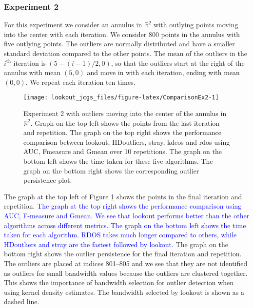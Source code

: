 \documentclass[12pt]{article}
\theoremstyle{definition}
\theoremstyle{definition}
\theoremstyle{definition}
\theoremstyle{definition}
\theoremstyle{remark}
\begin{document}
\hypertarget{experiment-2}{%
\subsubsection*{Experiment 2}\label{experiment-2}}

For this experiment we consider an annulus in \(\mathbb{R}^2\) with outlying points moving into the center with each iteration. We consider 800 points in the annulus with five outlying points. The outliers are normally distributed and have a smaller standard deviation compared to the other points. The mean of the outliers in the \(i^{\text{th}}\) iteration is \(\left(5 - (i-1) /2, 0 \right)\), so that the outliers start at the right of the annulus with mean \((5,0)\) and move in with each iteration, ending with mean \((0,0)\). We repeat each iteration ten times.

\begin{figure}
\texttt{[image: lookout\_jcgs\_files/figure-latex/ComparisonEx2-1]} \caption{Experiment 2 with outliers moving into the center of the annulus in $\mathbb{R}^2$. Graph on the top left shows the points from the last iteration and repetition. The graph on the top right shows the performance comparison between lookout, HDoutliers, stray, kdeos and rdos using AUC, Fmeasure and Gmean over 10 repetitions. The graph on the bottom left shows the time taken for these five algorithms. The graph on the bottom right shows the corresponding outlier persistence plot.}\label{fig:ComparisonEx2}
\end{figure}

The graph at the top left of Figure \ref{fig:ComparisonEx2} shows the points in the final iteration and repetition. \textcolor{blue}{ The graph at the top right shows the performance comparison using AUC, F-measure and Gmean. We see that lookout performs better than the other algorithms across different metrics. The graph on the bottom left shows the time taken for each algorithm. RDOS takes much longer compared to others, while HDoutliers and stray are the fastest followed by lookout.} The graph on the bottom right shows the outlier persistence for the final iteration and repetition. The outliers are placed at indices 801--805 and we see that they are not identified as outliers for small bandwidth values because the outliers are clustered together. This shows the importance of bandwidth selection for outlier detection when using kernel density estimates. The bandwidth selected by lookout is shown as a dashed line.
\end{document}
